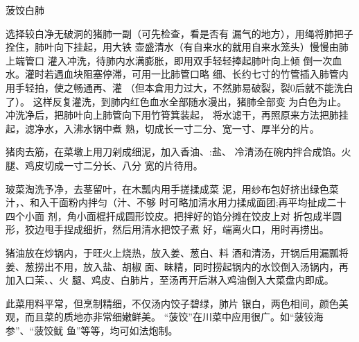 \begin{recipe}[菠饺银肺]{菠饺白肺}

\ingredients


\cooking

\step 选择较白净无破洞的猪肺一副（可先检查，看是否有 漏气的地方），用绳将肺把子拴住，肺叶向下挂起，用大铁 壶盛清水（有自来水的就用自来水笼头）慢慢由肺上端管口 灌入冲洗，待肺内水满膨胀，即用双手轻轻捧起肺叶向上倾 倒一次血水。灌时若遇血块阻塞停滞，可用一比肺管口略 细、长约七寸的竹管插入肺管内用手轻拍，使之畅通再、灌 （但本倉用力过大，不然肺易破裂，裂0后就不能洗白了）。 这样反复灌洗，到肺内红色血水全部随水漫出，猪肺全部变 为白色为止。冲洗净后，把肺叶向上肺管向下用竹筲箕装起， 将水滤干，再照原来方法把肺挂起，滤净水，入沸水锅中煮 熟，切成长一寸二分、宽一寸、厚半分的片。

\step 猪肉去筋，在菜墩上用刀剁成细泥，加入香油、:盐、 冷清汤在碗内拌合成馅。火腿、鸡皮切成一寸二分长、八分 宽的片待用。

\step 玻菜淘洗予净，去茎留叶，在木瓢内用手搓揉成菜 泥，用纱布包好挤出绿色菜汁，、和入干面粉内拌匀（汁、不够 时可略加清水用力揉成面团;再平均扯成二十四个小面 剂，角小面棍扞成圆形饺皮。把拌好的馅分摊在饺皮上对 折包成半圆形，狡边甩手捏成细折，然后用清水把饺子煮 好，端离火口，用时再捞出。

\step 猪油放在炒锅内，于旺火上烧热，放入姜、葱白、料 酒和清汤，开锅后用漏瓢将姜、葱捞出不用，放入盐、胡椒 面、昧精，同时捞起锅内的水饺倒入汤锅内，再加入口茉、、火 腿、鸡皮、白肺片，至汤再开后淋入鸡油倒入大菜盘内即成。

\notes

此菜用料平常，但烹制精细，不仅汤内饺子碧绿，肺片
银白，两色相间，颜色美观，而且菜的质地亦非常细嫩鲜美。 “菠饺”在川菜中应用很广。如“菠铰海参”、“菠饺鱿 鱼”等等，均可如法炮制。

\end{recipe}

